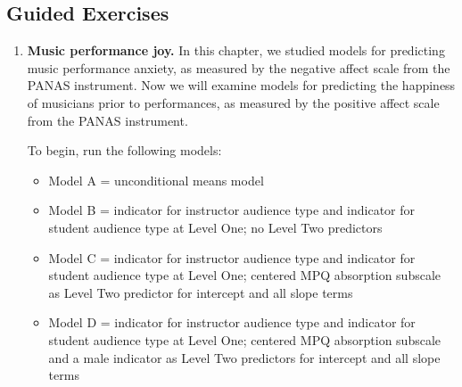 \documentclass[
]{krantz}
\providecommand{\tightlist}{%
  \setlength{\itemsep}{0pt}\setlength{\parskip}{0pt}}
\begin{document}
\hypertarget{guided-exercises-6}{%
\subsection{Guided Exercises}\label{guided-exercises-6}}

\begin{enumerate}
\def\labelenumi{\arabic{enumi}.}
\item
  \textbf{Music performance joy.} In this chapter, we studied models for predicting music performance anxiety, as measured by the negative affect scale from the PANAS instrument. Now we will examine models for predicting the happiness of musicians prior to performances, as measured by the positive affect scale from the PANAS instrument.

  To begin, run the following models:

  \begin{itemize}
  \tightlist
  \item
    Model A = unconditional means model
  \item
    Model B = indicator for instructor audience type and indicator for student audience type at Level One;
    no Level Two predictors
  \item
    Model C = indicator for instructor audience type and indicator for student audience type at Level One;
    centered MPQ absorption subscale as Level Two predictor for intercept and all slope terms
  \item
    Model D = indicator for instructor audience type and indicator for student audience type at Level One;
    centered MPQ absorption subscale and a male indicator as Level Two predictors for intercept and all slope terms
  \end{itemize}


\end{enumerate}
\end{document}
